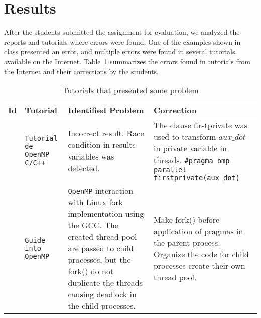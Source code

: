 \section{Results}
\label{sec:results}

After the students submitted the assignment for evaluation, we analyzed the reports and tutorials where errors were found. One of the examples shown in class presented an error, and multiple errors were found in several tutorials available on the Internet. Table~\ref{table:tutorials:with:problems} summarizes the errors found in tutorials from the Internet and their corrections by the students.
\begin{table}[ht]
\renewcommand{\arraystretch}{1.3}
\caption{Tutorials that presented some problem}
\label{table:tutorials:with:problems}
\centering
\begin{tabular}{|>{\centering\arraybackslash} m{.2cm}|>{\centering\arraybackslash} m{1.7cm}|  >{\centering\arraybackslash} m{2.75cm}|>{\centering\arraybackslash} m{2.75cm} |}
\hline
\textbf{Id}&\textbf{Tutorial} & \textbf{Identified Problem} & \textbf{Correction}\\
\hline

\begin{minipage}[m]{0.02\columnwidth}%
\centering
1
\end{minipage}&
\begin{minipage}[t]{0.22\columnwidth}%
\texttt{Tutorial de OpenMP C/C++~\cite{LCCV:UFAL:Tutorial}}
\end{minipage}&
\begin{minipage}[t]{0.33\columnwidth}%
Incorrect result. Race condition in results variables was detected.
\end{minipage}& 
\begin{minipage}[t]{0.33\columnwidth}%
The clause firstprivate was used to transform $aux\_dot$ in private variable in threads. \tiny{\texttt{\#pragma omp parallel firstprivate(aux\_dot)}}
\end{minipage}
\tabularnewline
\hline

\begin{minipage}[m]{0.02\columnwidth}%
\centering
2
\end{minipage}&
\begin{minipage}[t]{0.22\columnwidth}%
\texttt{Guide into OpenMP~\cite{OpenmpAndFork}}
\end{minipage}&
\begin{minipage}[t]{0.33\columnwidth}%
\texttt{OpenMP} interaction with Linux fork implementation using the GCC. The created thread pool are passed to child processes, but the fork() do not duplicate the threads causing deadlock in the child processes.
\end{minipage}&
\begin{minipage}[t]{0.33\columnwidth}%
Make fork() before application of pragmas in the parent process. Organize the code for child processes create their own thread pool.
\end{minipage}
\tabularnewline
\hline


\end{tabular}
\end{table}

